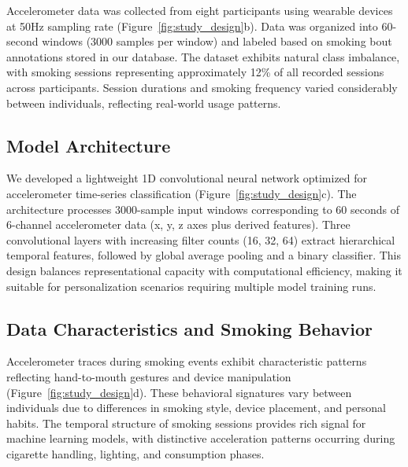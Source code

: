 \documentclass[11pt]{article}
\begin{document}
Accelerometer data was collected from eight participants using wearable devices at 50Hz sampling rate (Figure~\ref{fig:study_design}b). Data was organized into 60-second windows (3000 samples per window) and labeled based on smoking bout annotations stored in our database. The dataset exhibits natural class imbalance, with smoking sessions representing approximately 12\% of all recorded sessions across participants. Session durations and smoking frequency varied considerably between individuals, reflecting real-world usage patterns.

\subsection{Model Architecture}

We developed a lightweight 1D convolutional neural network optimized for accelerometer time-series classification (Figure~\ref{fig:study_design}c). The architecture processes 3000-sample input windows corresponding to 60 seconds of 6-channel accelerometer data (x, y, z axes plus derived features). Three convolutional layers with increasing filter counts (16, 32, 64) extract hierarchical temporal features, followed by global average pooling and a binary classifier. This design balances representational capacity with computational efficiency, making it suitable for personalization scenarios requiring multiple model training runs.

\subsection{Data Characteristics and Smoking Behavior}

Accelerometer traces during smoking events exhibit characteristic patterns reflecting hand-to-mouth gestures and device manipulation (Figure~\ref{fig:study_design}d). These behavioral signatures vary between individuals due to differences in smoking style, device placement, and personal habits. The temporal structure of smoking sessions provides rich signal for machine learning models, with distinctive acceleration patterns occurring during cigarette handling, lighting, and consumption phases.
\end{document}

